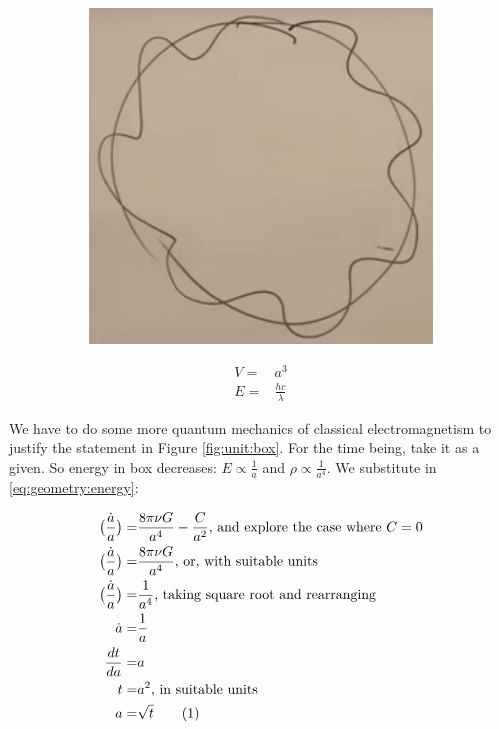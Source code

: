\documentclass[]{article}
\newcommand\numberthis{\addtocounter{equation}{1}\tag{\theequation}}
\begin{document}
\begin{figure}[H]
\begin{center}
\begin{subfigure}[t]{0.45\textwidth}
\begin{center}
					\includegraphics[width=\textwidth]{cosmo-2-standing-waves}
				\end{center}
			\end{subfigure}	
	\end{center}
\end{figure}

\begin{align*}
	V =& a^3\\
	E =& \frac{h c}{\lambda}
\end{align*}

We have to do some more quantum mechanics of classical electromagnetism to justify the statement in Figure \ref{fig:unit:box}. For the time being, take it as a given. So energy in box decreases: $E\propto \frac{1}{a}$ and $\rho\propto \frac{1}{a^4}$. We substitute in \eqref{eq:geometry:energy}:

\begin{align*}
	\big(\frac{\dot{a}}{a}\big)  =& \frac{8\pi\nu G}{a^4} - \frac{C}{a^2} \text{, and explore the case where $C=0$}\\
	\big(\frac{\dot{a}}{a}\big)  =& \frac{8\pi\nu G}{a^4} \text{, or, with suitable units}\\
	\big(\frac{\dot{a}}{a}\big)  =& \frac{1}{a^4} \text{, taking square root and rearranging} \\
	\dot{a} =& \frac{1}{a}\\
	\frac{dt}{da} =& a\\
	t =& a^2 \text{, in suitable units}\\
	a =& \sqrt{t} \numberthis \label{eq:a:scrt:t}
\end{align*}
\end{document}
